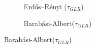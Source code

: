 
\begin{figure}%
    \centering
    \begin{subfigure}{0.3\columnwidth}
    \caption{Erdős–Rényi ($\tau_{GLR}$)}
    \label{tau_GLR_er}
    \end{subfigure}
    \hfill
    \begin{subfigure}{0.3\columnwidth}
    \caption{Barabási-Albert($\tau_{GLR}$)}%
    \label{tau_GLR_BA}%
    \end{subfigure}

\end{figure}
